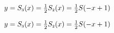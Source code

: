 {$y = S_{\text{\tiny $3$}}(x) = \frac{1}{2}  S_{\text{\tiny $2$}}(x) =  \frac{1}{2}S(-x+1)$}
{$y = S_{\text{\tiny $3$}}(x) = \frac{1}{2}  S_{\text{\tiny $2$}}(x) =  \frac{1}{2}S(-x+1)$

}